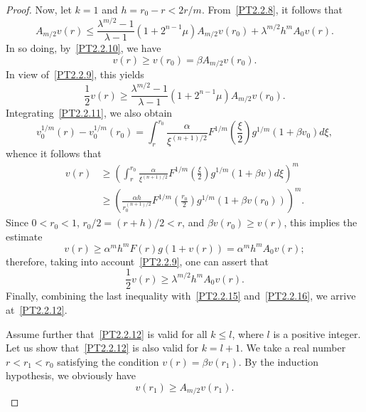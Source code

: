 \documentclass[10pt,a4paper]{amsart}
\begin{document}
\begin{proof}
Now, let $k = 1$ and $h = r_0 - r < 2 r / m$.
From~\eqref{PT2.2.8}, it follows that
\begin{equation}
	A_{m / 2} v (r)
	\le
	\frac{
		\lambda^{m / 2} - 1
	}{
		\lambda - 1
	}
	(1 + 2^{n - 1} \mu)
	A_{m / 2} v (r_0)
	+
	\lambda^{m / 2}
	h^m
	A_0 v (r).
	\label{PT2.2.15}
\end{equation}
In so doing, by~\eqref{PT2.2.10}, we have
$$
	v (r) \ge v (r_0) = \beta A_{m / 2} v (r_0).
$$
In view of~\eqref{PT2.2.9}, this yields
\begin{equation}
	\frac{1}{2}
	v (r)
	\ge
	\frac{
		\lambda^{m / 2} - 1
	}{
		\lambda - 1
	}
	(1 + 2^{n - 1} \mu)
	A_{m / 2} v (r_0).
	\label{PT2.2.16}
\end{equation}
Integrating~\eqref{PT2.2.11}, we also obtain
$$
	v_0^{1 / m} (r) - v_0^{1 / m} (r_0)
	=
	\int_r^{r_0}
	\frac{
		\alpha
	}{
		\xi^{(n + 1) / 2}
	}
	F^{1 / m} 
	\left(
		\frac{\xi}{2}
	\right)
	g^{1 / m} (1 + \beta v_0)
	d\xi,
$$
whence it follows that
\begin{align*}
	v (r)
	&
	{}
	\ge
	\left(
		\int_r^{r_0}
		\frac{
			\alpha
		}{
			\xi^{(n + 1) / 2}
		}
		F^{1 / m} 
		\left(
			\frac{\xi}{2}
		\right)
		g^{1 / m} (1 + \beta v)
		d\xi
	\right)^m
	\\
	&
	{}
	\ge
	\left(
		\frac{
			\alpha 
			h
		}{
			r_0^{(n + 1) / 2}
		}
		F^{1 / m} 
		\left(
			\frac{r_0}{2}
		\right)
		g^{1 / m} (1 + \beta v (r_0))
	\right)^m.	
\end{align*}
Since $0 < r_0 < 1$, $r_0 / 2 = (r + h) / 2 < r$, and $\beta v (r_0) \ge v (r)$, this implies the estimate
$$
	v (r)
	\ge
	\alpha^m
	h^m
	F (r)
	g (1 + v (r))
	=
	\alpha^m
	h^m
	A_0 v (r);
$$
therefore, taking into account~\eqref{PT2.2.9}, one can assert that
\begin{equation}
	\frac{1}{2}
	v (r)
	\ge
	\lambda^{m / 2}
	h^m
	A_0 v (r).
	\label{PT2.2.17}
\end{equation}
Finally, combining the last inequality with~\eqref{PT2.2.15} and~\eqref{PT2.2.16}, we arrive at~\eqref{PT2.2.12}.

Assume further that~\eqref{PT2.2.12} is valid for all $k \le l$, where $l$ is a positive integer. Let us show that~\eqref{PT2.2.12} is also valid for $k = l + 1$. We take a real number $r < r_1 < r_0$ satisfying the condition $v (r) = \beta v (r_1)$.
By the induction hypothesis, we obviously have
\begin{equation}
	v (r_1) \ge A_{m / 2} v (r_1).
	\label{PT2.2.18}
\end{equation}


\end{proof}
\end{document}
